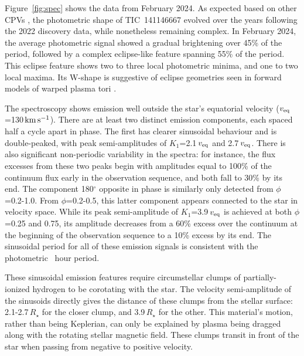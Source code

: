 \documentclass{nature3}
\newcommand{\kms}{\ensuremath{\rm km\,s^{-1}}}
\begin{document}
Figure~\ref{fig:spec} shows the data from February 2024.  As expected
based on other CPVs \cite{Bouma2024}, the photometric shape of
TIC~141146667 evolved over the years following the 2022 discovery
data, while nonetheless remaining complex.  In February 2024, the
average photometric signal showed a gradual brightening over 45\% of
the period, followed by a complex eclipse-like feature spanning 55\%
of the period.  This eclipse feature shows two to three
local photometric minima, and one to two local maxima.
Its W-shape is suggestive of eclipse geometries seen in forward models
of warped plasma tori \cite{Townsend2008}.

The spectroscopy shows emission well outside the star's equatorial
velocity ($v_{\rm eq}$=130\,\kms).  There are at least two distinct
emission components, each spaced half a cycle apart in phase.  The
first has clearer sinusoidal behaviour and is double-peaked, with peak
semi-amplitudes of $K_1$=2.1\,$v_{\rm eq}$ and 2.7\,$v_{\rm eq}$.
There is also significant non-periodic variability in the spectra: for
instance, the flux excesses from these two peaks begin with amplitudes
equal to 100\% of the continuum flux early in the observation
sequence, and both fall to 30\% by its end.  The component 180$^\circ$
opposite in phase is similarly only detected from $\phi$=0.2-1.0.
From $\phi$=0.2-0.5, this latter component appears connected to the
star in velocity space.  While its peak semi-amplitude of
$K_1$=3.9\,$v_{\rm eq}$ is achieved at both $\phi$=0.25 and 0.75, its
amplitude decreases from a 60\% excess over the continuum at the
beginning of the observation sequence to a 10\% excess by its end.
The sinusoidal period for all of these emission signals is consistent
with the photometric \periodhr\ hour period.  

These sinusoidal emission features require circumstellar clumps of
partially-ionized hydrogen to be corotating with the star.  The
velocity semi-amplitude of the sinusoids directly gives the distance
of these clumps from the stellar surface: 2.1-2.7\,$R_\star$ for the
closer clump, and 3.9\,$R_\star$ for the other.  This material's
motion, rather than being Keplerian, can only be explained by plasma
being dragged along with the rotating stellar magnetic field.  These
clumps transit in front of the star when passing from negative to
positive velocity.
\end{document}
